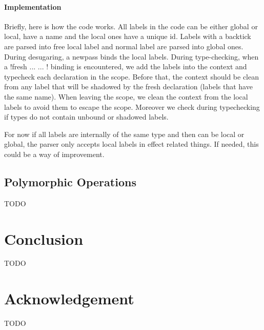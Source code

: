 \documentclass[11pt, nonacm=true, language=french, language=english]{acmart}
\begin{document}
\paragraph{Implementation}
Briefly, here is how the code works. All labels in the code can be either global or local, have a name and the local ones have a unique id. Labels with a backtick are parsed into free local label and normal label are parsed into global ones. During desugaring, a newpass binds the local labels. During type-checking, when a !fresh ... { ... }! binding is encountered, we add the labels into the context and typecheck each declaration in the scope. Before that, the context should be clean from any label that will be shadowed by the fresh declaration (labels that have the same name). When leaving the scope, we clean the context from the local labels to avoid them to escape the scope. Moreover we check during typechecking if types do not contain unbound or shadowed labels.

\begin{rem}
  For now if all labels are internally of the same type and then can be local or global, the parser only accepts local labels in effect related things. If needed, this could be a way of improvement.
\end{rem}


\subsection{Polymorphic Operations}

TODO



\section{Conclusion}
\label{sec:conclusion}

TODO

\section{Acknowledgement}
\label{sec:acknowledgement}

TODO













\end{document}
